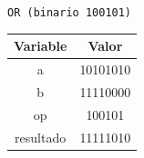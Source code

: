 \documentclass[letterpaper]{sae}
\begin{document}
\begin{figure}[H] %
\label{fig:test3}
\end{figure}

\verb+OR (binario 100101)+\\

\begin{center}
	\begin{tabular}{|c|c|}
		\hline 
		Variable & Valor\tabularnewline
		\hline 
		\hline 
		a & 10101010\tabularnewline
		\hline 
		b & 11110000\tabularnewline
		\hline 
		op & 100101\tabularnewline
		\hline 
		resultado & 11111010\tabularnewline
		\hline 
	\end{tabular}
\end{center}
\end{document}
